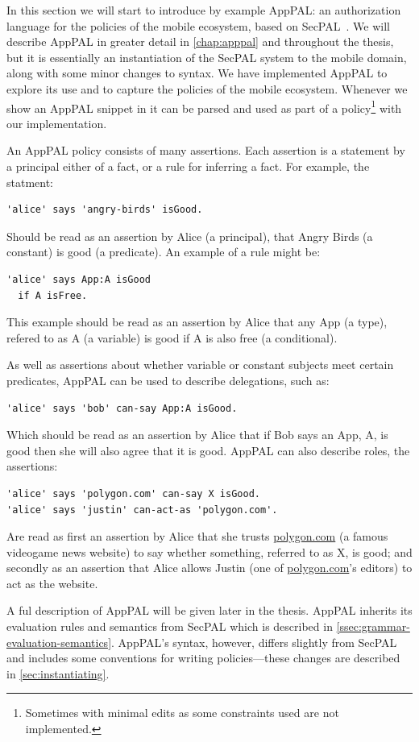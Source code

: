 \documentclass[thesis.tex]{subfiles}
\begin{document}
In this section we will start to introduce by example AppPAL: an authorization
language for the policies of the mobile ecosystem, based on
SecPAL~\cite{becker_secpal:_2006}. We will describe AppPAL in greater detail in
\autoref{chap:apppal} and throughout the thesis, but it is essentially an
instantiation of the SecPAL system to the mobile domain, along with some minor
changes to syntax. We have implemented AppPAL to explore its use and to capture
the policies of the mobile ecosystem. Whenever we show an AppPAL snippet in
 it can be parsed and used as part of a
policy\footnote{Sometimes with minimal edits as some constraints used are not
implemented.} with our implementation.

An AppPAL policy consists of many assertions.  Each assertion is a statement by
a principal either of a fact, or a rule for inferring a fact.  For example, the statment:
\begin{lstlisting}
'alice' says 'angry-birds' isGood.
\end{lstlisting}
Should be read as an assertion by Alice (a principal), that Angry Birds (a
constant) is good (a predicate).  An example of a rule might be:
\begin{lstlisting}
'alice' says App:A isGood 
  if A isFree.
\end{lstlisting}
This example should be read as an assertion by Alice that any App (a type),
refered to as A (a variable) is good if A is also free (a conditional).   

As
well as assertions about whether variable or constant subjects meet certain
predicates, AppPAL can be used to describe delegations, such as:
\begin{lstlisting}
'alice' says 'bob' can-say App:A isGood.
\end{lstlisting}
Which should be read as an assertion by Alice that if Bob says an App, A, is
good then she will also agree that it is good.  AppPAL can also describe roles,
the assertions:
\begin{lstlisting}
'alice' says 'polygon.com' can-say X isGood.
'alice' says 'justin' can-act-as 'polygon.com'.
\end{lstlisting}
Are read as first an assertion by Alice that she trusts \url{polygon.com} (a
famous videogame news website) to say whether something, referred to as X, is
good; and secondly as an assertion that Alice allows Justin (one of
\url{polygon.com}'s editors) to act as the website.  

A ful description of AppPAL will be given later in the thesis.  
AppPAL inherits its evaluation rules and semantics from SecPAL which is described in
\autoref{ssec:grammar-evaluation-semantics}.  AppPAL's syntax, however, differs slightly
from SecPAL and includes some conventions for writing policies---these changes
are described in \autoref{sec:instantiating}.
\end{document}
